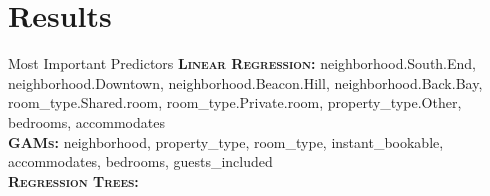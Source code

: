 \documentclass[10pt]{beamer}
\begin{document}
\section{Results}
	\begin{frame}{Most Important Predictors}
    	\textbf{\textsc{Linear Regression:}} neighborhood.South.End, neighborhood.Downtown, neighborhood.Beacon.Hill, neighborhood.Back.Bay, room\_type.Shared.room, room\_type.Private.room, property\_type.Other, bedrooms, accommodates~\\
        \textbf{\textsc{GAMs:}} neighborhood, property\_type, room\_type, instant\_bookable, accommodates, bedrooms, guests\_included ~\\
        \textbf{\textsc{Regression Trees:}}
        \begin{table}[H]
\centering

\label{my-label2}
\end{table}
    \end{frame}
\end{document}

